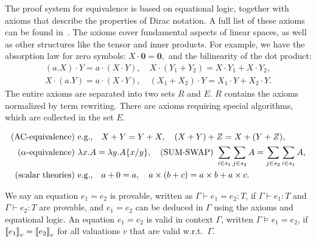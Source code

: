 The proof system for equivalence is based on equational logic, together with axioms that describe the properties of Dirac notation. A full list of these axioms can be found in~. The axioms cover fundamental aspects of linear spaces, as well as other structures like the tensor and inner products. For example, we have the absorption law for zero symbols:
\(X \cdot \mathbf{0} = \mathbf{0},\)
and the bilinearity of the dot product:
\begin{align*}
(a.X) \cdot Y = a \cdot (X \cdot Y), \quad X \cdot (Y_1 + Y_2) = X \cdot Y_1 + X \cdot Y_2, \\
X \cdot (a.Y) = a \cdot (X \cdot Y), \quad (X_1 + X_2) \cdot Y = X_1 \cdot Y + X_2 \cdot Y.
\end{align*}
The entire axioms are separated into  two sets $R$ and $E$.
$R$ contains the axioms normalized by term rewriting. There are axioms requiring special algorithms, which are collected in the set $E$.
\begin{definition}
\label{def: axiom E}
\begin{align*}
    \textup{(AC-equivalence)} &\ \text{e.g.,} \quad X + Y = Y + X, \quad (X + Y) + Z = X + (Y + Z), \\
    \textup{($\alpha$-equivalence)} &\ \lambda x . A = \lambda y . A\{x/y\},
    \quad
    \textup{(SUM-SWAP)} \ \sum_{i \in s_1} \sum_{j \in s_2} A = \sum_{j \in s_2} \sum_{i \in s_1} A, \\
    \textup{(scalar theories)} &\ \text{e.g.,} \quad a + 0 = a, \quad a \times (b + c) = a \times b + a \times c.
\end{align*}
\end{definition}



We say an equation $e_1 = e_2$ is provable, written as $\Gamma \vdash e_1 = e_2 : T$, if $\Gamma \vdash e_1 : T$ and $\Gamma \vdash e_2 : T$ are provable, and $e_1 = e_2$ can be deduced in $\Gamma$ using the axioms and equational logic.
An equation \( e_1 = e_2 \) is valid in context $\Gamma$, written \(
\Gamma \vDash e_1 = e_2 \), if \( {\llbracket e_1 \rrbracket}_v = {\llbracket e_2 \rrbracket}_v \) for
all valuations \( v \) that are valid w.r.t.\, \( \Gamma \).

